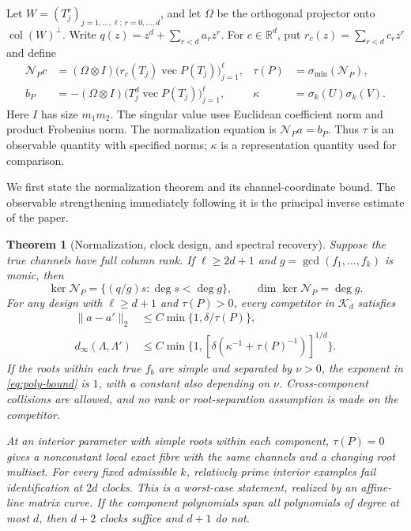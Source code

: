 \documentclass[11pt,reqno]{amsart}
\numberwithin{equation}{section}
\newtheorem{theorem}{Theorem}[section]
\theoremstyle{definition}\newtheorem{definition}[theorem]{Definition}
\theoremstyle{remark}\newtheorem{remark}[theorem]{Remark}
\newcommand{\R}{\mathbb R}
\newcommand{\cK}{\mathcal K}
\newcommand{\cN}{\mathcal N}
\begin{document}
Let $W=(T_j^r)_{j=1,\ldots,\ell;\,r=0,\ldots,d}$, and let $\Omega$
be the orthogonal projector onto $\operatorname{col}(W)^\perp$. Write
$q(z)=z^d+\sum_{r<d}a_rz^r$. For $c\in\R^d$, put
$r_c(z)=\sum_{r<d}c_rz^r$ and define
\begin{align}
 \cN_Pc&=(\Omega\otimes I)
       \big(r_c(T_j)\operatorname{vec}P(T_j)\big)_{j=1}^{\ell},
       &\tau(P)&=\sigma_{\min}(\cN_P),\nonumber\\
 b_P&=-(\Omega\otimes I)
       \big(T_j^d\operatorname{vec}P(T_j)\big)_{j=1}^{\ell},
       &\kappa&=\sigma_k(U)\sigma_k(V).           \label{eq:normalization}
\end{align}
Here $I$ has size $m_1m_2$. The singular value uses Euclidean
coefficient norm and product Frobenius norm. The normalization equation
is $\cN_Pa=b_P$. Thus $\tau$ is an observable quantity with specified
norms; $\kappa$ is a representation quantity used for comparison.

We first state the normalization theorem and its channel-coordinate
bound. The observable strengthening immediately following it is the
principal inverse estimate of the paper.
\begin{theorem}[Normalization, clock design, and spectral recovery]
\label{thm:main}
Suppose the true channels have full column rank. If $\ell\ge2d+1$
and $g=\gcd(f_1,\ldots,f_k)$ is monic, then
\begin{equation}\label{eq:kernel}
 \ker\cN_P=\{(q/g)s:\deg s<\deg g\},\qquad
 \dim\ker\cN_P=\deg g.
\end{equation}
For any design with $\ell\ge d+1$ and $\tau(P)>0$, every competitor
in $\cK_d$ satisfies
\begin{align}
 \|a-a'\|_2&\le C\min\{1,\delta/\tau(P)\},        \label{eq:q-bound}\\
 d_\infty(\Lambda,\Lambda')&\le
 C\min\{1,[\delta(\kappa^{-1}+\tau(P)^{-1})]^{1/d}\}.
                                                        \label{eq:poly-bound}
\end{align}
If the roots within each true $f_b$ are simple and separated by
$\nu>0$, the exponent in \eqref{eq:poly-bound} is $1$, with a constant
also depending on $\nu$. Cross-component collisions are allowed, and
no rank or root-separation assumption is made on the competitor.

At an interior parameter with simple roots within each component,
$\tau(P)=0$ gives a nonconstant local exact fibre with the same channels
and a changing root multiset. For every fixed admissible $k$, relatively
prime interior examples fail identification at $2d$ clocks. This is a
worst-case statement, realized by an affine-line matrix curve. If the
component polynomials span all polynomials of degree at most $d$, then
$d+2$ clocks suffice and $d+1$ do not.
\end{theorem}
\end{document}
